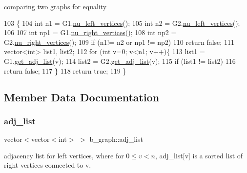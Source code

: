 comparing two graphs for equality 


\begin{DoxyCode}
103 \{
104   \textcolor{keywordtype}{int} n1 = G1.\hyperlink{classb__graph_a5e71d5c97f2501b0b93c17146cf7e68e}{nu\_left\_vertices}();
105   \textcolor{keywordtype}{int} n2 = G2.\hyperlink{classb__graph_a5e71d5c97f2501b0b93c17146cf7e68e}{nu\_left\_vertices}();
106   
107   \textcolor{keywordtype}{int} np1 = G1.\hyperlink{classb__graph_abecfd7d6fbd0d9a554fe0d9aa3241a04}{nu\_right\_vertices}();
108   \textcolor{keywordtype}{int} np2 = G2.\hyperlink{classb__graph_abecfd7d6fbd0d9a554fe0d9aa3241a04}{nu\_right\_vertices}();
109   \textcolor{keywordflow}{if} (n1!= n2 or np1 != np2)
110     \textcolor{keywordflow}{return} \textcolor{keyword}{false};
111   vector<int> list1, list2;
112   \textcolor{keywordflow}{for} (\textcolor{keywordtype}{int} v=0; v<n1; v++)\{
113     list1 = G1.\hyperlink{classb__graph_aa81c7179b9c6cb4986c4b41e84a85799}{get\_adj\_list}(v);
114     list2 = G2.\hyperlink{classb__graph_aa81c7179b9c6cb4986c4b41e84a85799}{get\_adj\_list}(v);
115     \textcolor{keywordflow}{if} (list1 != list2)
116       \textcolor{keywordflow}{return} \textcolor{keyword}{false};
117   \}
118   \textcolor{keywordflow}{return} \textcolor{keyword}{true};
119 \}
\end{DoxyCode}


\subsection{Member Data Documentation}
\mbox{\label{classb__graph_a2a89d2e8f958270952aab2e8769b7342}} 
\subsubsection{\texorpdfstring{adj\+\_\+list}{adj\_list}}
{\footnotesize\ttfamily vector$<$vector$<$int$>$ $>$ b\+\_\+graph\+::adj\+\_\+list\hspace{0.3cm}{\ttfamily [private]}}



adjacency list for left vertices, where for $0 \leq v < n $, adj\+\_\+list\mbox{[}v\mbox{]} is a sorted list of right vertices connected to v. 

\mbox{\label{classb__graph_a311d16462dbb10c47b3a6c80a42139d9}} 
